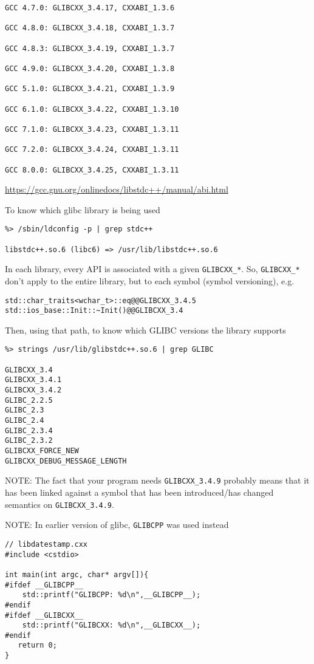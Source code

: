 \begin{enumerate}
{\begin{verbatim}
GCC 4.7.0: GLIBCXX_3.4.17, CXXABI_1.3.6

GCC 4.8.0: GLIBCXX_3.4.18, CXXABI_1.3.7

GCC 4.8.3: GLIBCXX_3.4.19, CXXABI_1.3.7

GCC 4.9.0: GLIBCXX_3.4.20, CXXABI_1.3.8

GCC 5.1.0: GLIBCXX_3.4.21, CXXABI_1.3.9

GCC 6.1.0: GLIBCXX_3.4.22, CXXABI_1.3.10

GCC 7.1.0: GLIBCXX_3.4.23, CXXABI_1.3.11

GCC 7.2.0: GLIBCXX_3.4.24, CXXABI_1.3.11

GCC 8.0.0: GLIBCXX_3.4.25, CXXABI_1.3.11
\end{verbatim}
}
\url{https://gcc.gnu.org/onlinedocs/libstdc++/manual/abi.html}
\end{enumerate}

To know which glibc library is being used
\begin{verbatim}
%> /sbin/ldconfig -p | grep stdc++

libstdc++.so.6 (libc6) => /usr/lib/libstdc++.so.6
\end{verbatim}

In each library, every API is associated with a given 
\verb!GLIBCXX_*!.  So, \verb!GLIBCXX_*! don't apply to the entire library, but
to each symbol (symbol versioning), e.g.
\begin{verbatim}
std::char_traits<wchar_t>::eq@@GLIBCXX_3.4.5 
std::ios_base::Init::~Init()@@GLIBCXX_3.4 
\end{verbatim}
 
Then, using that path, to know which GLIBC versions the library supports
\begin{verbatim}
%> strings /usr/lib/glibstdc++.so.6 | grep GLIBC

GLIBCXX_3.4
GLIBCXX_3.4.1
GLIBCXX_3.4.2
GLIBC_2.2.5
GLIBC_2.3
GLIBC_2.4
GLIBC_2.3.4
GLIBC_2.3.2
GLIBCXX_FORCE_NEW
GLIBCXX_DEBUG_MESSAGE_LENGTH
\end{verbatim}

NOTE: The fact that your program needs \verb!GLIBCXX_3.4.9! probably means that
it has been linked against a symbol that has been introduced/has changed
semantics on \verb!GLIBCXX_3.4.9!.

NOTE: In earlier version of glibc, \verb!GLIBCPP! was used instead
\begin{verbatim}
// libdatestamp.cxx
#include <cstdio>

int main(int argc, char* argv[]){
#ifdef __GLIBCPP__
    std::printf("GLIBCPP: %d\n",__GLIBCPP__);
#endif
#ifdef __GLIBCXX__
    std::printf("GLIBCXX: %d\n",__GLIBCXX__);
#endif
   return 0;
}
\end{verbatim}

